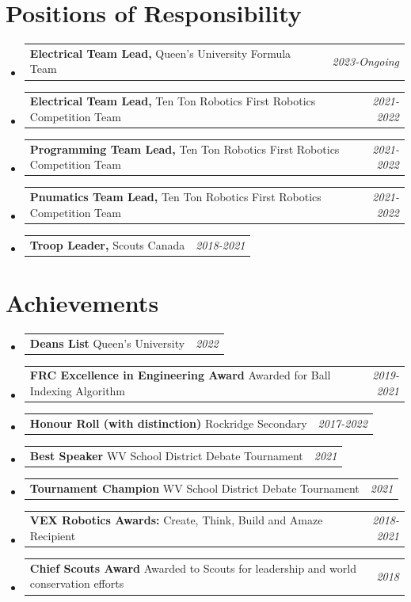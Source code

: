 \documentclass[a4paper,11pt]{article}
\makeatletter
\newcommand{\resumePOR}[3]{
\vspace{0.5mm}\item
    \begin{tabular*}{0.97\textwidth}[t]{l@{\extracolsep{\fill}}r}
        \textbf{#1}\hspace{0.3mm}#2 & \textit{\small{#3}} 
    \end{tabular*}
    \vspace{-2mm}
}
\newcommand{\resumeSubHeadingListStart}{\begin{itemize}[leftmargin=*,labelsep=0mm]}
\newcommand{\resumeSubHeadingListEnd}{\end{itemize}\vspace{2mm}}
\makeatother
\begin{document}
\section{\textbf{Positions of Responsibility}}
\vspace{-0.4mm}
\resumeSubHeadingListStart
\resumePOR{ Electrical Team Lead, } %
    {Queen's University Formula Team} %
    {2023-Ongoing} %
\resumePOR{ Electrical Team Lead, } %
    {Ten Ton Robotics First Robotics Competition Team} %
    {2021-2022} %
\resumePOR{ Programming Team Lead, } %
    {Ten Ton Robotics First Robotics Competition Team} %
    {2021-2022} %
\resumePOR{ Pnumatics Team Lead, } %
    {Ten Ton Robotics First Robotics Competition Team} %
    {2021-2022} %
\resumePOR{ Troop Leader, } %
    {Scouts Canada} %
    {2018-2021} %
\resumeSubHeadingListEnd
\vspace{-5mm}




\section{\textbf{Achievements}}
\vspace{-0.4mm}
\resumeSubHeadingListStart
\resumePOR{ Deans List } %
    {Queen's University} %
    {2022} %

\resumePOR{ FRC Excellence in Engineering Award } %
    {Awarded for Ball Indexing Algorithm} %
    {2019-2021} %

\resumePOR{ Honour Roll (with distinction) } %
    {Rockridge Secondary} %
    {2017-2022} %

\resumePOR{ Best Speaker } %
    {WV School District Debate Tournament} %
    {2021} %

\resumePOR{ Tournament Champion } %
    {WV School District Debate Tournament} %
    {2021} %

\resumePOR{ VEX Robotics Awards: } %
    {Create, Think, Build and Amaze Recipient} %
    {2018-2021} %
    
\resumePOR{ Chief Scouts Award } %
    {Awarded to Scouts for leadership and world conservation efforts} %
    {2018} %
\resumeSubHeadingListEnd
\vspace{-5mm}



\end{document}
